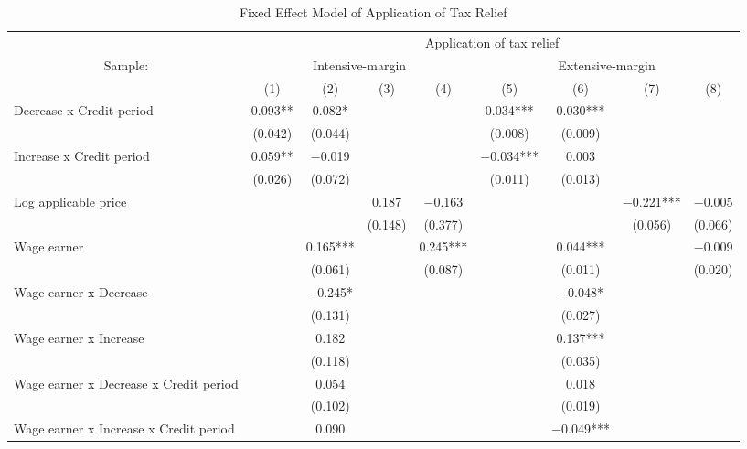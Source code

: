 
\begin{landscape}\begin{table}

\caption{Fixed Effect Model of Application of Tax Relief\label{tab:fe-application}}
\centering
\fontsize{8}{10}\selectfont
\begin{threeparttable}
\begin{tabular}[t]{lcccccccc}
\toprule
\multicolumn{1}{c}{ } & \multicolumn{8}{c}{Application of tax relief} \\
\cmidrule(l{3pt}r{3pt}){2-9}
\multicolumn{1}{c}{Sample:} & \multicolumn{4}{c}{Intensive-margin} & \multicolumn{4}{c}{Extensive-margin} \\
\cmidrule(l{3pt}r{3pt}){1-1} \cmidrule(l{3pt}r{3pt}){2-5} \cmidrule(l{3pt}r{3pt}){6-9}
  & (1) & (2) & (3) & (4) & (5) & (6) & (7) & (8)\\
\midrule
Decrease x Credit period & \num{0.093}** & \num{0.082}* &  &  & \num{0.034}*** & \num{0.030}*** &  & \\
 & (\num{0.042}) & (\num{0.044}) &  &  & (\num{0.008}) & (\num{0.009}) &  & \\
Increase x Credit period & \num{0.059}** & \num{-0.019} &  &  & \num{-0.034}*** & \num{0.003} &  & \\
 & (\num{0.026}) & (\num{0.072}) &  &  & (\num{0.011}) & (\num{0.013}) &  & \\
Log applicable price &  &  & \num{0.187} & \num{-0.163} &  &  & \num{-0.221}*** & \num{-0.005}\\
 &  &  & (\num{0.148}) & (\num{0.377}) &  &  & (\num{0.056}) & (\num{0.066})\\
Wage earner &  & \num{0.165}*** &  & \num{0.245}*** &  & \num{0.044}*** &  & \num{-0.009}\\
 &  & (\num{0.061}) &  & (\num{0.087}) &  & (\num{0.011}) &  & (\num{0.020})\\
Wage earner x Decrease &  & \num{-0.245}* &  &  &  & \num{-0.048}* &  & \\
 &  & (\num{0.131}) &  &  &  & (\num{0.027}) &  & \\
Wage earner x Increase &  & \num{0.182} &  &  &  & \num{0.137}*** &  & \\
 &  & (\num{0.118}) &  &  &  & (\num{0.035}) &  & \\
Wage earner x Decrease x Credit period &  & \num{0.054} &  &  &  & \num{0.018} &  & \\
 &  & (\num{0.102}) &  &  &  & (\num{0.019}) &  & \\
Wage earner x Increase x Credit period &  & \num{0.090} &  &  &  & \num{-0.049}*** &  & \\

\end{tabular}
\end{threeparttable}
\end{table}
\end{landscape}
